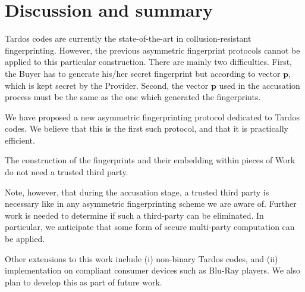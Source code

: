 \documentclass{article}
\begin{document}
\section{Discussion and summary}
\label{sec:discussions}

Tardos codes are currently the state-of-the-art in collusion-resistant
fingerprinting. However, the previous asymmetric fingerprint protocols 
cannot be applied to this particular construction. There are mainly two difficulties.
First, the Buyer has to generate his/her secret fingerprint but according to vector $\mathbf{p}$, which is kept secret by the Provider. Second, the vector $\mathbf{p}$ used in the accusation process must be the same as the one which generated the fingerprints.  




We have proposed a new asymmetric fingerprinting protocol dedicated to Tardos codes.  We believe that this is the first such protocol, and that it is practically efficient.

The construction of the fingerprints and their embedding within pieces of Work do not
need a trusted third party. 

Note, however, that during the accusation stage, a
trusted third party is necessary like in any asymmetric fingerprinting scheme we are aware of. Further work is needed to determine
if such a third-party can be eliminated.  In particular, we anticipate
that some form of secure multi-party computation can be applied.

Other extensions to this work include (i) non-binary Tardos codes, and
(ii) implementation on compliant consumer devices such as Blu-Ray
players.  We also plan to develop this as part of future work.



\end{document}
